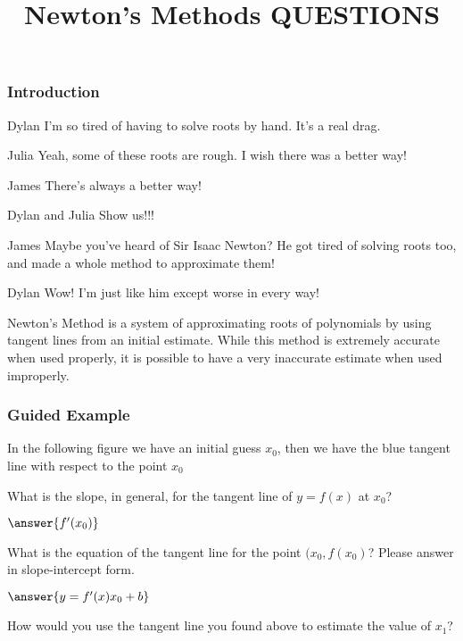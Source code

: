 \documentclass{ximera}
\title{Newton's Methods QUESTIONS}
\begin{document}
\maketitle
\subsubsection{Introduction}
\begin{dialogue}
\item[Dylan] I'm so tired of having to solve roots by hand. It's a real drag.
\item[Julia] Yeah, some of these roots are rough. I wish there was a better way!
\item[James] There's always a better way!
\item[Dylan and Julia] Show us!!!
\item[James] Maybe you've heard of Sir Isaac Newton? He got tired of solving roots too, and made a whole method to approximate them!
\item[Dylan] Wow! I'm just like him except worse in every way!
\end{dialogue}
Newton's Method is a system of approximating roots of polynomials by using tangent lines from an initial estimate. While this method is extremely accurate when used properly, it is possible to have a very inaccurate estimate when used improperly.
\subsubsection{Guided Example}
In the following figure we have an initial guess $x_{0}$, then we have the blue tangent line with respect to the point $x_{0}$

\begin{question}
What is the slope, in general, for the tangent line of $y=f(x)$ at $x_{0}$?

$\answer{f'(x_0)}$

What is the equation of the tangent line for the point $(x_{0},f(x_{0})$? Please answer in slope-intercept form.

$\answer{y = f'(x)x_0+b}$

How would you use the tangent line you found above to estimate the value of $x_{1}$?

\begin{freeResponse}
\end{freeResponse}

\end{question}
\end{document}
